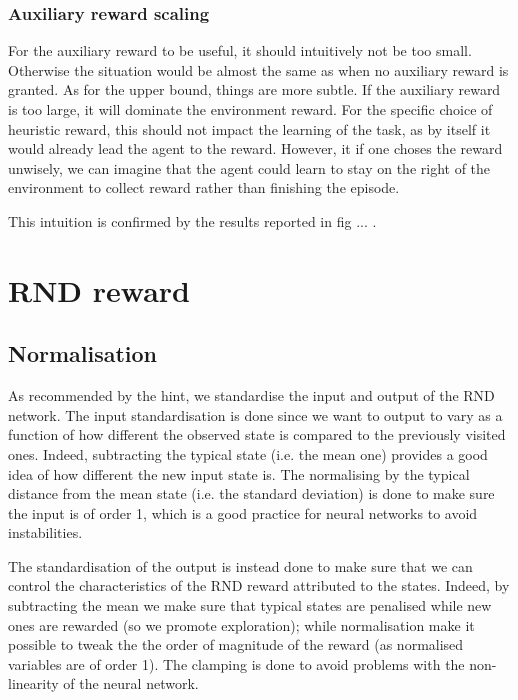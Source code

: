 \documentclass[a4paper, 12pt,oneside]{article}
\begin{document}
        \subsubsection{Auxiliary reward scaling}
        For the auxiliary reward to be useful, it should intuitively not be too small. Otherwise the situation would be almost the same as when no auxiliary reward is granted. As for the upper bound, things are more subtle. If the auxiliary reward is too large, it will dominate the environment reward. For the specific choice of heuristic reward, this should not impact the learning of the task, as by itself it would already lead the agent to the reward. However, it if one choses the reward unwisely, we can imagine that the agent could learn to stay on the right of the environment to collect reward rather than finishing the episode.

        This intuition is confirmed by the results reported in fig ... . 
        \section{RND reward}
            \subsection{Normalisation} 
            As recommended by the hint, we standardise the input and output of the RND network. The input standardisation is done since we want to output to vary as a function of how different the observed state is compared to the previously visited ones. Indeed, subtracting the typical state (i.e. the mean one) provides a good idea of how different the new input state is. The normalising by the typical distance from the mean state (i.e. the standard deviation) is done to make sure the input is of order 1, which is a good practice for neural networks to avoid instabilities.
            
            The standardisation of the output is instead done to make sure that we can control the characteristics of the RND reward attributed to the states. Indeed, by subtracting the mean we make sure that typical states are penalised  while new ones are rewarded (so we promote exploration); while normalisation make it possible to tweak the the order of magnitude of the reward (as normalised variables are of order 1). The clamping is done to avoid problems with the non-linearity of the neural network. 
\end{document}
